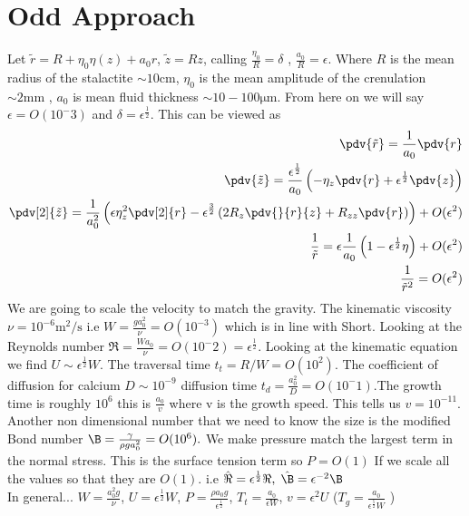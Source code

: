 \documentclass[12pt]{article}
\newcommand{\rt}{^{\frac{1}{2}}}
\begin{document}
\section{Odd Approach}
Let $\tilde r = R +\eta_0\eta(z) + a_0 r$, $\tilde z = R z$, calling $\frac{\eta_0}{R} = \delta$ , $\frac{a_0}{R}=\epsilon$. Where $R$ is the mean radius of the stalactite $\sim 10\mathrm{cm}$, $\eta_0$ is the mean amplitude of the crenulation $\sim 2\mathrm{mm}$ , $a_0$ is mean fluid thickness $\sim 10-100\mathrm{\mu m}$. From here on we will say $\epsilon = O(10^-3)$ and $\delta = \epsilon^{\frac{1}{2}}$.
This can be viewed as
\begin{align}
\pdv{\tilde r } = \frac{1}{a_0}\pdv{r}\\
\pdv{\tilde z} = \frac{\epsilon\rt}{a_0}\left(-\eta_z\pdv{r}+\epsilon\rt\pdv{z}\right)\\
\pdv[2]{\tilde z}= \frac{1}{a_0^2}\left(\epsilon\eta_z^2\pdv[2]{r}-\epsilon^{\frac{3}{2}}\left(2R_z\pdv{}{r}{z}+R_{zz}\pdv{r}\right)\right) +O(\epsilon^2)\\
\frac{1}{\tilde r} = \epsilon\frac{1}{a_0}\left(1 -\epsilon\rt\eta\right)+O(\epsilon^2)\\
\frac{1}{\tilde r^2} = O(\epsilon^2)
\end{align}
We are going to scale the velocity to match the gravity. The kinematic viscosity $\nu = 10^{-6} \mathrm{m^2/s}$  i.e $W = \frac{ga_0^2}{\nu} =O( 10^{-3})$ which is in line with Short.
Looking at the Reynolds number $\Re = \frac{Wa_0}{\nu} = O(10^-2) = \epsilon\rt$. Looking at the kinematic equation we find $U\sim \epsilon\rt W$. The traversal time $t_t= R/W =O(10^2)$. The coefficient of diffusion for calcium $D\sim 10^{-9}$ diffusion time  $t_d=\frac{a_0^2}{D} =O(10^-1)$.The growth time is roughly $10^6$ this is $\frac{a_0}{v}$ where v is the growth speed. This tells us $v = 10^{-11}$. Another non dimensional number that we need to know the size is the modified Bond number $\B = \frac{\gamma}{\rho g a_0^2}= O(10^6). $ We make pressure match the largest term in the normal stress. This is the surface tension term so $P=O(1)$ If we scale all the values so that they are $O(1)$. i.e $\hat{\Re} = \epsilon\rt\Re,\; \hat{\B}= \epsilon^{-2}\B$ 
\\
In general...
$W = \frac{a_0^2 g}{\nu}$, $U=\epsilon\rt W$, $ P = \frac{\rho a_0 g}{\epsilon\rt}$, $T_t =\frac{a_0}{\epsilon W}$, $v = \epsilon^2 U$ ($T_g=\frac{a_0}{\epsilon^{\frac{5}{2}} W}$ )
\end{document}
